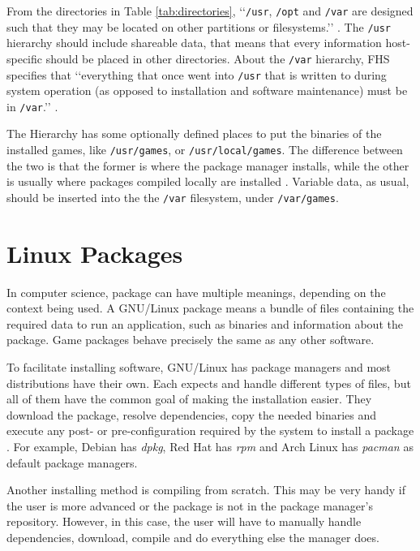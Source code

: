 From the directories in Table \ref{tab:directories}, \lq\lq \texttt{/usr}, \texttt{/opt} and \texttt{/var} are designed such that they may be located on other partitions or filesystems.\rq\rq{} \cite{allbery2015filesystem}. The \texttt{/usr} hierarchy should include shareable data, that means that every information host-specific should be placed in other directories. About the \texttt{/var} hierarchy, FHS specifies that \lq\lq everything that once went into \texttt{/usr} that is written to during system operation (as opposed to installation and software maintenance) must be in \texttt{/var}.\rq\rq{} \cite{allbery2015filesystem}.

The Hierarchy has some optionally defined places to put the binaries of the installed games, like \texttt{/usr/games}, or \texttt{/usr/local/games}. The difference between the two is that the former is where the package manager installs, while the other is usually where packages compiled locally are installed \cite{blfsdevelopmentteam2017}. Variable data, as usual, should be inserted into the the \texttt{/var} filesystem, under \texttt{/var/games}.


\section{Linux Packages}
\label {sec:packages}

In computer science, package can have multiple meanings, depending on the context being used. A GNU/Linux package means a bundle of files containing the required data to run an application, such as binaries and information about the package. Game packages behave precisely the same as any other software.

To facilitate installing software, GNU/Linux has package managers and most  distributions have their own. Each expects and handle different types of files, but all of them have the common goal of making the installation easier. They download the package, resolve dependencies, copy the needed binaries and execute any post- or pre-configuration required by the system to install a package \cite{linode2017linux}. For example, Debian has \textit{dpkg}, Red Hat has \textit{rpm} and Arch Linux has \textit{pacman} as default package managers.

Another installing method is compiling from scratch. This may be very handy if the user is more advanced or the package is not in the package manager's repository. However, in this case, the user will have to manually handle dependencies, download, compile and do everything else the manager does.


